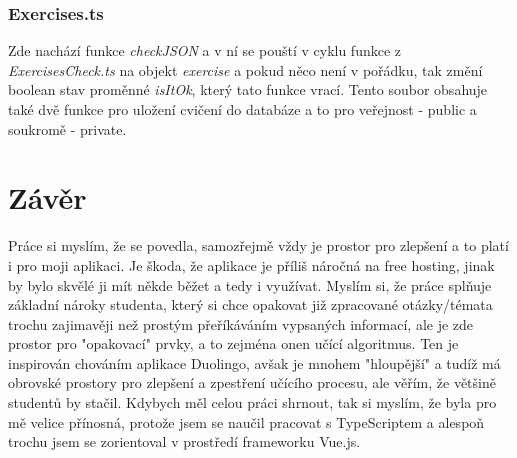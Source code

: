 \documentclass[12pt]{report}
\begin{document}
\subsection{Exercises.ts}
Zde nachází funkce \emph{checkJSON} a v ní se pouští v cyklu funkce z \emph{ExercisesCheck.ts} na objekt \emph{exercise} a pokud něco není v pořádku, tak změní boolean stav proměnné \emph{isItOk}, který tato funkce vrací. Tento soubor obsahuje také dvě funkce pro uložení cvičení do databáze a to pro veřejnost - public a soukromě - private.

\chapter{Závěr}
Práce si myslím, že se povedla, samozřejmě vždy je prostor pro zlepšení a to platí i pro moji aplikaci. Je škoda, že aplikace je příliš náročná na free hosting, jinak by bylo skvělé ji mít někde běžet a tedy i využívat. Myslím si, že práce splňuje základní nároky studenta, který si chce opakovat již zpracované otázky/témata trochu zajimavěji než prostým přeříkáváním vypsaných informací, ale je zde prostor pro "opakovací" prvky, a to zejména onen učící algoritmus. Ten je inspirován chováním aplikace Duolingo, avšak je mnohem "hloupější" a tudíž má obrovské prostory pro zlepšení a zpestření učícího procesu, ale věřím, že většině studentů by stačil. Kdybych měl celou práci shrnout, tak si myslím, že byla pro mě velice přínosná, protože jsem se naučil pracovat s TypeScriptem a alespoň trochu jsem se zorientoval v prostředí frameworku Vue.js.

\newpage
\nocite{*}
\printbibliography[heading=bibintoc,title={Zdroje}]
\newpage
{}
\listoflistings
\end{document}
